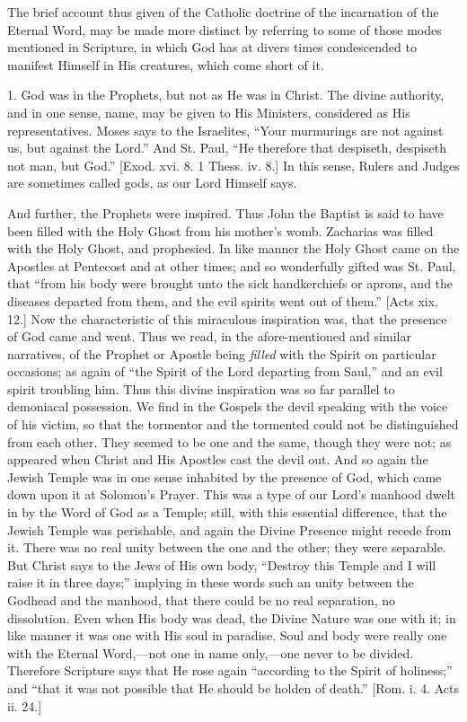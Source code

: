 The brief account thus given of the Catholic doctrine of the
incarnation of the Eternal Word, may be made more distinct by
referring to some of those modes mentioned in Scripture, in which God
has at divers times condescended to manifest Himself in His creatures,
which come short of it.

1. God was in the Prophets, but not as He was in Christ. The divine
authority, and in one sense, name, may be given to His Ministers,
considered as His representatives. Moses says to the Israelites,
``Your murmurings are not against us, but against the Lord.''
And St. Paul, ``He therefore that despiseth, despiseth not man,
but God.'' [Exod. xvi. 8. 1 Thess. iv. 8.] In this sense, Rulers
and Judges are sometimes called gods, as our Lord Himself says.

And further, the Prophets were inspired. Thus John the Baptist is
said to have been filled with the Holy Ghost from his mother's womb.
Zacharias was filled with the Holy Ghost, and prophesied. In like
manner the Holy Ghost came on the Apostles at Pentecost and at other
times; and so wonderfully gifted was St. Paul, that ``from his
body were brought unto the sick handkerchiefs or aprons, and the
diseases departed from them, and the evil spirits went out of
them.'' [Acts xix. 12.] Now the characteristic of this miraculous
inspiration was, that the presence of God came and went. Thus we read,
in the afore-mentioned and similar narratives, of the Prophet or
Apostle being \emph{filled} with the Spirit on particular occasions;
as again of ``the Spirit of the Lord departing from Saul,''
and an evil spirit troubling him. Thus this divine inspiration was so
far parallel to demoniacal possession. We find in the Gospels the devil speaking with the voice of his victim, so that the tormentor and
the tormented could not be distinguished from each other. They seemed
to be one and the same, though they were not; as appeared when Christ
and His Apostles cast the devil out. And so again the Jewish Temple
was in one sense inhabited by the presence of God, which came down
upon it at Solomon's Prayer. This was a type of our Lord's manhood
dwelt in by the Word of God as a Temple; still, with this essential
difference, that the Jewish Temple was perishable, and again the
Divine Presence might recede from it. There was no real unity between
the one and the other; they were separable. But Christ says to the
Jews of His own body, ``Destroy this Temple and I will raise it in
three days;'' implying in these words such an unity between the
Godhead and the manhood, that there could be no real separation, no
dissolution. Even when His body was dead, the Divine Nature was one
with it; in like manner it was one with His soul in paradise. Soul and
body were really one with the Eternal Word,—not one in name only,—one
never to be divided. Therefore Scripture says that He rose again
``according to the Spirit of holiness;'' and ``that it was
not possible that He should be holden of death.'' [Rom. i. 4. Acts
ii. 24.]

